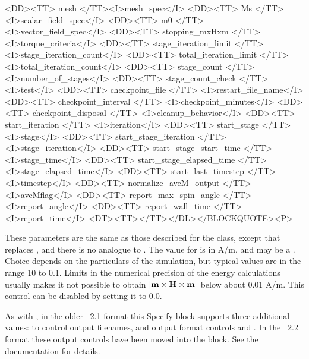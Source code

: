 \begin{description}
\begin{rawhtml}
{<DD><TT> mesh </TT><I>mesh_spec</I>
<DD><TT> Ms </TT> <I>scalar_field_spec</I>
<DD><TT> m0 </TT> <I>vector_field_spec</I>
<DD><TT> stopping_mxHxm </TT><I>torque_criteria</I>
<DD><TT> stage_iteration_limit </TT><I>stage_iteration_count</I>
<DD><TT> total_iteration_limit </TT><I>total_iteration_count</I>
<DD><TT> stage_count </TT><I>number_of_stages</I>
<DD><TT> stage_count_check </TT><I>test</I>
<DD><TT> checkpoint_file </TT> <I>restart_file_name</I>
<DD><TT> checkpoint_interval </TT> <I>checkpoint_minutes</I>
<DD><TT> checkpoint_disposal </TT> <I>cleanup_behavior</I>
<DD><TT> start_iteration </TT> <I>iteration</I>
<DD><TT> start_stage </TT> <I>stage</I>
<DD><TT> start_stage_iteration </TT> <I>stage_iteration</I>
<DD><TT> start_stage_start_time </TT> <I>stage_time</I>
<DD><TT> start_stage_elapsed_time </TT> <I>stage_elapsed_time</I>
<DD><TT> start_last_timestep </TT> <I>timestep</I>
<DD><TT> normalize_aveM_output </TT> <I>aveMflag</I>
<DD><TT> report_max_spin_angle </TT> <I>report_angle</I>
<DD><TT> report_wall_time </TT> <I>report_time</I>
<DT><TT>}</TT></DL></BLOCKQUOTE><P>
\end{rawhtml}
These parameters are the same as those described for the
class, except that
 replaces , and there is no
analogue to .  The value for  is
in A/m, and may be a
.
Choice depends on the particulars of the simulation, but typical values
are in the range 10 to 0.1.  Limits in the numerical precision of the
energy calculations usually makes it not possible to obtain
$|\textbf{m}\times\textbf{H}\times\textbf{m}|$ below about 0.01 A/m.  This control can be
disabled by setting it to 0.0.

As with , in the older \MIF~2.1 format this Specify
block supports three additional values:  to control
output filenames, and output format controls
 and
.  In the \MIF~2.2 format these
output controls have been moved into the  block.  See the
documentation for details.


\end{description}
